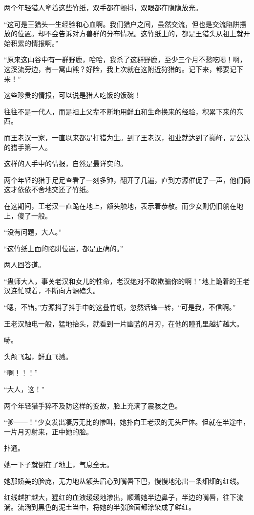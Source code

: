 
\begin{this_body}

两个年轻猎人拿着这些竹纸，双手都在颤抖，双眼都在隐隐放光。

“这可是王猎头一生经验和心血啊。我们猎户之间，虽然交流，但也是交流陷阱摆放的位置。却不会告诉对方兽群的分布情况。这竹纸上的，都是王猎头从祖上就开始积累的情报啊。”

“原来这山谷中有一群野鹿，哈哈，我杀了这群野鹿，至少三个月不愁吃喝！啊，这溪流旁边，有一窝山熊？好险，我上次就在这附近狩猎的。记下来，都要记下来！”

这些珍贵的情报，可以说是猎人吃饭的饭碗！

往往不是一代人，而是祖上父辈不断地用鲜血和生命换来的经验，积累下来的东西。

而王老汉一家，一直以来都是打猎为生。到了王老汉，祖业就达到了巅峰，是公认的猎手第一人。

这样的人手中的情报，自然是最详实的。

两个年轻的猎手足足查看了一刻多钟，翻开了几遍，直到方源催促了一声，他们俩这才依依不舍地交还了竹纸。

在这期间，王老汉一直跪在地上，额头触地，表示着恭敬。而少女则仍旧躺在地上，傻了一般。

“没有问题，大人。”

“这竹纸上面的陷阱位置，都是正确的。”

两人回答道。

“蛊师大人，事关老汉和女儿的性命，老汉绝对不敢欺骗你的啊！”地上跪着的王老汉连忙喊着，不断向方源磕头。

“嗯，不错。”方源抖了抖手中的这叠竹纸，忽然话锋一转，“可是我，不信啊。”

王老汉触电一般，猛地抬头，就看到一片幽蓝的月刃，在他的瞳孔里越扩越大。

哧。

头颅飞起，鲜血飞溅。

“啊！！！”

“大人，这！”

两个年轻猎手猝不及防这样的变故，脸上充满了震骇之色。

“爹――！”少女发出凄厉无比的惨叫，她扑向王老汉的无头尸体。但就在半途中，一片月刃射来，正中她的脸。

扑通。

她一下子就倒在了地上，气息全无。

她那娇美的脸庞，无力地从额头眉心到嘴唇下巴，慢慢地沁出一条细细的红线。

红线越扩越大，猩红的血液缓缓地渗出，顺着她半边鼻子，半边的嘴唇，往下流淌。流淌到黑色的泥土当中，将她的半张脸面都涂染成了鲜红。


\end{this_body}
